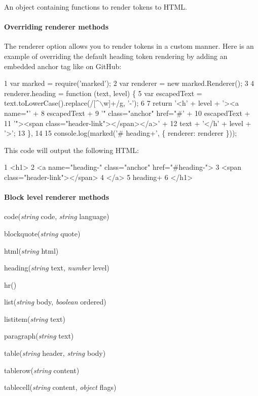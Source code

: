 An object containing functions to render tokens to H\+T\+M\+L.

\paragraph*{Overriding renderer methods}

The renderer option allows you to render tokens in a custom manner. Here is an example of overriding the default heading token rendering by adding an embedded anchor tag like on Git\+Hub\+:


\begin{DoxyCode}
1 var marked = require('marked');
2 var renderer = new marked.Renderer();
3 
4 renderer.heading = function (text, level) \{
5   var escapedText = text.toLowerCase().replace(/[^\(\backslash\)w]+/g, '-');
6 
7   return '<h' + level + '><a name="' +
8                 escapedText +
9                  '" class="anchor" href="#' +
10                  escapedText +
11                  '"><span class="header-link"></span></a>' +
12                   text + '</h' + level + '>';
13 \},
14 
15 console.log(marked('# heading+', \{ renderer: renderer \}));
\end{DoxyCode}
 This code will output the following H\+T\+M\+L\+: 
\begin{DoxyCode}
1 <h1>
2   <a name="heading-" class="anchor" href="#heading-">
3     <span class="header-link"></span>
4   </a>
5   heading+
6 </h1>
\end{DoxyCode}


\paragraph*{Block level renderer methods}


\begin{DoxyItemize}
\item code({\itshape string} code, {\itshape string} language)
\item blockquote({\itshape string} quote)
\item html({\itshape string} html)
\item heading({\itshape string} text, {\itshape number} level)
\item hr()
\item list({\itshape string} body, {\itshape boolean} ordered)
\item listitem({\itshape string} text)
\item paragraph({\itshape string} text)
\item table({\itshape string} header, {\itshape string} body)
\item tablerow({\itshape string} content)
\item tablecell({\itshape string} content, {\itshape object} flags)
\end{DoxyItemize}

